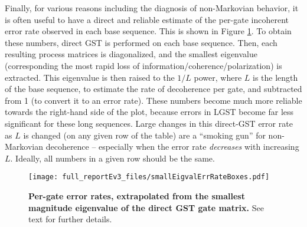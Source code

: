 {Finally, for various reasons including the diagnosis of non-Markovian behavior, it is often useful to have a direct and reliable estimate of the per-gate incoherent error rate observed in each base sequence.  This is shown in Figure \ref{smallEigvalErrRateColorBoxPlot}.  To obtain these numbers, direct GST is performed on each base sequence.  Then, each resulting process matrices is diagonalized, and the smallest eigenvalue (corresponding the most rapid loss of information/coherence/polarization) is extracted.  This eigenvalue is then raised to the $1/L$ power, where $L$ is the length of the base sequence, to estimate the rate of decoherence per gate, and subtracted from 1 (to convert it to an error rate).  These numbers become much more reliable towards the right-hand side of the plot, because errors in LGST become far less significant for these long sequences.  Large changes in this direct-GST error rate as $L$ is changed (on any given row of the table) are a ``smoking gun'' for non-Markovian decoherence -- especially when the error rate \emph{decreases} with increasing $L$.  Ideally, all numbers in a given row should be the same.

\begin{figure}
\begin{center}
\texttt{[image: full\_reportEv3\_files/smallEigvalErrRateBoxes.pdf]}
\caption{\textbf{Per-gate error rates, extrapolated from the smallest magnitude eigenvalue of the direct GST gate matrix.}  See text for further details.\label{smallEigvalErrRateColorBoxPlot}}
\end{center}
\end{figure}

}{}

